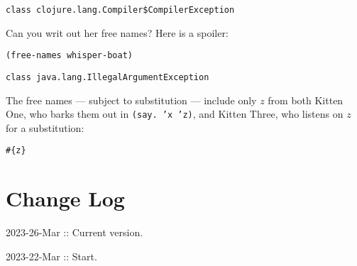 \documentclass[10pt,oneside,x11names]{article}
\theoremstyle{definition}
\theoremstyle{warning}
\begin{document}
\begin{verbatim}
class clojure.lang.Compiler$CompilerException
\end{verbatim}


Can you writ out her free names? Here is a spoiler:

\vskip 0.26cm
\begin{verbatim}
(free-names whisper-boat)
\end{verbatim}

\begin{verbatim}
class java.lang.IllegalArgumentException
\end{verbatim}


The free names --- subject to substitution --- include only \(z\)
from both Kitten One, who barks them out in \texttt{(say. 'x 'z)}, and
Kitten Three, who listens on \(z\) for a substitution:

\begin{verbatim}
#{z}
\end{verbatim}

\section{Change Log}
\label{sec:org8b24e62}

2023-26-Mar :: Current version.

2023-22-Mar :: Start.
\end{document}
